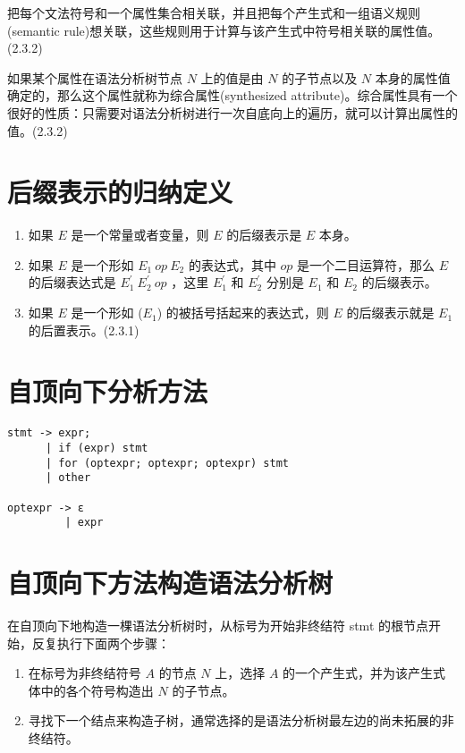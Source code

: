 把每个文法符号和一个属性集合相关联，并且把每个产生式和一组语义规则(semantic rule)想关联，这些规则用于计算与该产生式中符号相关联的属性值。(2.3.2)

如果某个属性在语法分析树节点 $N$ 上的值是由 $N$ 的子节点以及 $N$ 本身的属性值确定的，那么这个属性就称为综合属性(synthesized attribute)。综合属性具有一个很好的性质：只需要对语法分析树进行一次自底向上的遍历，就可以计算出属性的值。(2.3.2)


\section*{后缀表示的归纳定义}

\begin{enumerate}
\item 如果 $E$ 是一个常量或者变量，则 $E$ 的后缀表示是 $E$ 本身。
\item 如果 $E$ 是一个形如 $E_1\ op \ E_2$ 的表达式，其中 $op$ 是一个二目运算符，那么 $E$ 的后缀表达式是 $E_{1}^{'} \ E_{2}^{'} \ op$ ，这里 $E_{1}^{'}$ 和 $E_{2}^{'}$ 分别是 $E_{1}$ 和 $E_{2}$ 的后缀表示。
\item 如果 $E$ 是一个形如 ($E_{1}$) 的被括号括起来的表达式，则 $E$ 的后缀表示就是 $E_{1}$ 的后置表示。(2.3.1)
\end{enumerate}

\pagebreak
\section*{自顶向下分析方法}

\begin{lstlisting}[caption={示例文法}]
stmt -> expr;
      | if (expr) stmt
      | for (optexpr; optexpr; optexpr) stmt
      | other

optexpr -> ε
         | expr 
\end{lstlisting}

\section*{自顶向下方法构造语法分析树}

在自顶向下地构造一棵语法分析树时，从标号为开始非终结符 stmt 的根节点开始，反复执行下面两个步骤：

\begin{enumerate}
\item 在标号为非终结符号 $A$ 的节点 $N$ 上，选择 $A$ 的一个产生式，并为该产生式体中的各个符号构造出 $N$ 的子节点。
\item 寻找下一个结点来构造子树，通常选择的是语法分析树最左边的尚未拓展的非终结符。
\end{enumerate}

